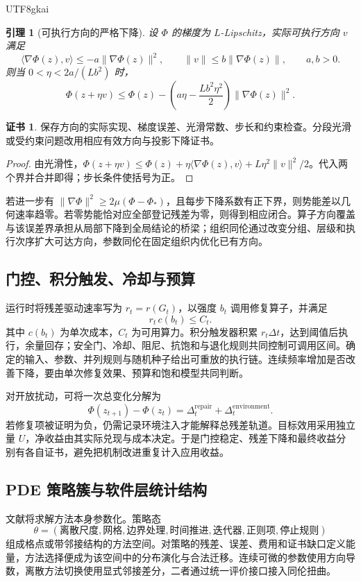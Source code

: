 \documentclass[11pt,a4paper]{article}
\theoremstyle{plain}
\newtheorem{lemma}[theorem]{引理}
\theoremstyle{definition}
\newtheorem*{certificate}{证书}
\theoremstyle{remark}
\begin{document}
\begin{CJK*}{UTF8}{gkai}
\begin{lemma}[可执行方向的严格下降]
\label{ss:descent}
设 $\Phi$ 的梯度为 $L$-Lipschitz，实际可执行方向 $v$ 满足
\[
 \langle\nabla\Phi(z),v\rangle\le-a\|\nabla\Phi(z)\|^2,
 \qquad \|v\|\le b\|\nabla\Phi(z)\|,
 \qquad a,b>0.
\]
则当 $0<\eta<2a/(Lb^2)$ 时，
\[
 \Phi(z+\eta v)\le\Phi(z)
 -\left(a\eta-\frac{Lb^2\eta^2}{2}\right)\|\nabla\Phi(z)\|^2.
\]
\end{lemma}
\begin{certificate}
保存方向的实际实现、梯度误差、光滑常数、步长和约束检查。分段光滑或受约束问题改用相应有效方向与投影下降证书。
\end{certificate}
\begin{proof}
由光滑性，$\Phi(z+\eta v)\le\Phi(z)+\eta\langle\nabla\Phi(z),v\rangle+L\eta^2\|v\|^2/2$。代入两个界并合并即得；步长条件使括号为正。
\end{proof}

若进一步有 $\|\nabla\Phi\|^2\ge2\mu(\Phi-\Phi_*)$，且每步下降系数有正下界，则势能差以几何速率趋零。若零势能恰对应全部登记残差为零，则得到相应闭合。算子方向覆盖与该误差界承担从局部下降到全局结论的桥梁；组织同伦通过改变分组、层级和执行次序扩大可达方向，参数同伦在固定组织内优化已有方向。

\subsection{门控、积分触发、冷却与预算}

运行时将残差驱动速率写为 $r_t=r(G_t)$，以强度 $b_t$ 调用修复算子，并满足
\[
 r_t\,c(b_t)\le C_t.
\]
其中 $c(b_t)$ 为单次成本，$C_t$ 为可用算力。积分触发器积累 $r_t\Delta t$，达到阈值后执行，余量回存；安全门、冷却、阻尼、抗饱和与退化规则共同控制可调用区间。确定的输入、参数、并列规则与随机种子给出可重放的执行链。连续频率增加是否改善下降，要由单次修复效果、预算和饱和模型共同判断。

对开放扰动，可将一次总变化分解为
\[
 \Phi(z_{t+1})-\Phi(z_t)
 =\Delta_t^{\mathrm{repair}}+\Delta_t^{\mathrm{environment}}.
\]
若修复项被证明为负，仍需记录环境注入才能解释总残差轨道。目标效用采用独立量 $U$，净收益由其实际兑现与成本决定。于是门控稳定、残差下降和最终收益分别有各自证书，避免把机制改进重复计入应用收益。

\subsection{PDE 策略簇与软件层统计结构}

文献\cite{S32}将求解方法本身参数化。策略态
\[
 \theta=(\text{离散尺度},\text{网格},\text{边界处理},\text{时间推进},
          \text{迭代器},\text{正则项},\text{停止规则})
\]
组成格点或带邻接结构的方法空间。对策略的残差、误差、费用和证书缺口定义能量，方法选择便成为该空间中的分布演化与合法迁移。连续可微的参数使用方向导数，离散方法切换使用显式邻接差分，二者通过统一评价接口接入同伦扭曲。


\end{CJK*}
\end{document}
